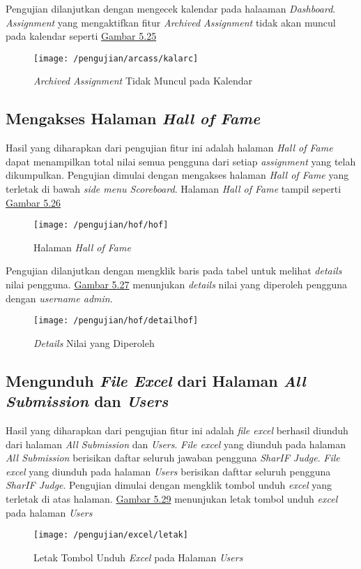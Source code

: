 	Pengujian dilanjutkan dengan mengecek kalendar pada halaaman \textit{Dashboard}. \textit{Assignment} yang mengaktifkan fitur \textit{Archived Assignment} tidak akan muncul pada kalendar seperti \hyperref[fig:listarc]{Gambar 5.25}
	\begin{figure}[H]
		\centering  
		\texttt{[image: /pengujian/arcass/kalarc]}  
		\caption[\textit{Archived Assignment} Tidak Muncul pada Kalendar]{\textit{Archived Assignment} Tidak Muncul pada Kalendar} 
		\label{fig:kalarc} 
	\end{figure}

	\subsection{Mengakses Halaman \textit{Hall of Fame}}
	Hasil yang diharapkan dari pengujian fitur ini adalah halaman \textit{Hall of Fame} dapat menampilkan total nilai semua pengguna dari setiap \textit{assignment} yang telah dikumpulkan. Pengujian dimulai dengan mengakses halaman \textit{Hall of Fame} yang terletak di bawah \textit{side menu Scoreboard}. Halaman \textit{Hall of Fame} tampil seperti \hyperref[fig:halhof]{Gambar 5.26}
	\begin{figure}[H]
		\centering  
		\texttt{[image: /pengujian/hof/hof]}  
		\caption[Halaman \textit{Hall of Fame}]{Halaman \textit{Hall of Fame}} 
		\label{fig:halhof} 
	\end{figure}

	Pengujian dilanjutkan dengan mengklik baris pada tabel untuk melihat \textit{details} nilai pengguna. \hyperref[fig:dethof]{Gambar 5.27} menunjukan \textit{details} nilai yang diperoleh pengguna dengan \textit{username admin}.
	\begin{figure}[H]
		\centering  
		\texttt{[image: /pengujian/hof/detailhof]}  
		\caption[\textit{Details} Nilai yang Diperoleh]{\textit{Details} Nilai yang Diperoleh} 
		\label{fig:dethof} 
	\end{figure}

	\subsection{Mengunduh \textit{File Excel} dari Halaman \textit{All Submission} dan \textit{Users}}
	Hasil yang diharapkan dari pengujian fitur ini adalah \textit{file excel} berhasil diunduh dari halaman \textit{All Submission} dan \textit{Users}. \textit{File excel} yang diunduh pada halaman \textit{All Submission} berisikan daftar seluruh jawaban pengguna \textit{SharIF Judge}. \textit{File excel} yang diunduh pada halaman \textit{Users} berisikan dafttar seluruh pengguna \textit{SharIF Judge}. Pengujian dimulai dengan mengklik tombol unduh \textit{excel} yang terletak di atas halaman. \hyperref[fig:unduh]{Gambar 5.29} menunjukan letak tombol unduh \textit{excel} pada halaman \textit{Users}
	\begin{figure}[H]
		\centering  
		\texttt{[image: /pengujian/excel/letak]}  
		\caption[Letak Tombol Unduh \textit{Excel} pada Halaman \textit{Users}]{Letak Tombol Unduh \textit{Excel} pada Halaman \textit{Users}} 
		\label{fig:unduh} 
	\end{figure}

